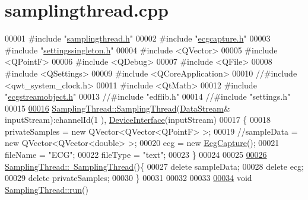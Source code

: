 \hypertarget{samplingthread_8cpp_source}{}\section{samplingthread.\+cpp}
\label{samplingthread_8cpp_source}

\begin{DoxyCode}
00001 \textcolor{preprocessor}{#include "\hyperlink{samplingthread_8h}{samplingthread.h}"}
00002 \textcolor{preprocessor}{#include "\hyperlink{ecgcapture_8h}{ecgcapture.h}"}
00003 \textcolor{preprocessor}{#include "\hyperlink{settingssingleton_8h}{settingssingleton.h}"}
00004 \textcolor{preprocessor}{#include <QVector>}
00005 \textcolor{preprocessor}{#include <QPointF>}
00006 \textcolor{preprocessor}{#include <QDebug>}
00007 \textcolor{preprocessor}{#include <QFile>}
00008 \textcolor{preprocessor}{#include <QSettings>}
00009 \textcolor{preprocessor}{#include <QCoreApplication>}
00010 \textcolor{comment}{//#include <qwt\_system\_clock.h>}
00011 \textcolor{preprocessor}{#include <QtMath>}
00012 \textcolor{preprocessor}{#include "\hyperlink{ecgstreamobject_8h}{ecgstreamobject.h}"}
00013 \textcolor{comment}{//#include "edflib.h"}
00014 \textcolor{comment}{//#include "settings.h"}
00015 
\hypertarget{samplingthread_8cpp_source.tex_l00016}{}\hyperlink{classSamplingThread_a0ba71431079dd2c80adee37f3e392d98}{00016} \hyperlink{classSamplingThread_a0ba71431079dd2c80adee37f3e392d98}{SamplingThread::SamplingThread}(\hyperlink{classDataStream}{DataStream}& inputStream):channelId(1
      ), \hyperlink{classDeviceInterface}{DeviceInterface}(inputStream)
00017 \{
00018     privateSamples = \textcolor{keyword}{new} QVector<QVector<QPointF> >;
00019    \textcolor{comment}{//sampleData = new QVector<QVector<double> >;}
00020     ecg = \textcolor{keyword}{new} \hyperlink{classEcgCapture}{EcgCapture}();
00021     fileName = \textcolor{stringliteral}{"ECG"};
00022     fileType = \textcolor{stringliteral}{"text"};
00023 \}
00024 
00025 
\hypertarget{samplingthread_8cpp_source.tex_l00026}{}\hyperlink{classSamplingThread_af1f6a9a930f6c9e3c2ecc3d3d1646373}{00026} \hyperlink{classSamplingThread_af1f6a9a930f6c9e3c2ecc3d3d1646373}{SamplingThread::~SamplingThread}()\{
00027     \textcolor{keyword}{delete} sampleData;
00028     \textcolor{keyword}{delete} ecg;
00029     \textcolor{keyword}{delete} privateSamples;
00030 \}
00031 
00032 
00033 
\hypertarget{samplingthread_8cpp_source.tex_l00034}{}\hyperlink{classSamplingThread_a3145c2d8049b3f126f78cb1274154eeb}{00034} \textcolor{keywordtype}{void} \hyperlink{classSamplingThread_a3145c2d8049b3f126f78cb1274154eeb}{SamplingThread::run}()

\end{DoxyCode}

